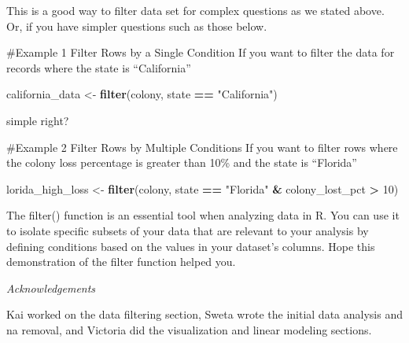 \documentclass[
]{article}
\newenvironment{Shaded}{\begin{snugshade}}{\end{snugshade}}
\newcommand{\DecValTok}[1]{\textcolor[rgb]{0.00,0.00,0.81}{#1}}
\newcommand{\FunctionTok}[1]{\textcolor[rgb]{0.13,0.29,0.53}{\textbf{#1}}}
\newcommand{\NormalTok}[1]{#1}
\newcommand{\OtherTok}[1]{\textcolor[rgb]{0.56,0.35,0.01}{#1}}
\newcommand{\SpecialCharTok}[1]{\textcolor[rgb]{0.81,0.36,0.00}{\textbf{#1}}}
\newcommand{\StringTok}[1]{\textcolor[rgb]{0.31,0.60,0.02}{#1}}
\begin{document}
This is a good way to filter data set for complex questions as we stated
above. Or, if you have simpler questions such as those below.

\#Example 1 Filter Rows by a Single Condition If you want to filter the
data for records where the state is ``California''

\begin{Shaded}
\begin{Highlighting}[]
\NormalTok{california\_data }\OtherTok{\textless{}{-}} \FunctionTok{filter}\NormalTok{(colony, state }\SpecialCharTok{==} \StringTok{"California"}\NormalTok{)}
\end{Highlighting}
\end{Shaded}

simple right?

\#Example 2 Filter Rows by Multiple Conditions If you want to filter
rows where the colony loss percentage is greater than 10\% and the state
is ``Florida''

\begin{Shaded}
\begin{Highlighting}[]
\NormalTok{lorida\_high\_loss }\OtherTok{\textless{}{-}} \FunctionTok{filter}\NormalTok{(colony, state }\SpecialCharTok{==} \StringTok{"Florida"} \SpecialCharTok{\&}\NormalTok{ colony\_lost\_pct }\SpecialCharTok{\textgreater{}} \DecValTok{10}\NormalTok{)}
\end{Highlighting}
\end{Shaded}

The filter() function is an essential tool when analyzing data in R. You
can use it to isolate specific subsets of your data that are relevant to
your analysis by defining conditions based on the values in your
dataset's columns. Hope this demonstration of the filter function helped
you.

\emph{Acknowledgements}

Kai worked on the data filtering section, Sweta wrote the initial data
analysis and na removal, and Victoria did the visualization and linear
modeling sections.
\end{document}
